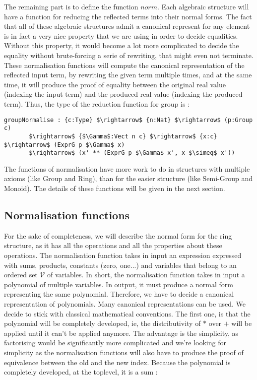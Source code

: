 The remaining part is to define the function $norm$. Each algebraic structure will have a function for reducing the reflected terms into their normal forms. The fact that all of these algebraic structures admit a canonical represent for any element is in fact a very nice property that we are using in order to decide equalities. Without this property, it would become a lot more complicated to decide the equality without brute-forcing a serie of rewriting, that might even not terminate.
These normalisation functions will compute the canonical representation of the reflected input term, by rewriting the given term multiple times, and at the same time, it will produce the proof of equality between the original real value (indexing the input term) and the produced real value (indexing the produced term). Thus, the type of the reduction function for group is :


\begin{lstlisting}
groupNormalise : {c:Type} $\rightarrow$ {n:Nat} $\rightarrow$ (p:Group c) 	   	   	   
	   $\rightarrow$ {$\Gamma$:Vect n c} $\rightarrow$ {x:c} $\rightarrow$ (ExprG p $\Gamma$ x) 
	   $\rightarrow$ (x' ** (ExprG p $\Gamma$ x', x $\simeq$ x'))
\end{lstlisting}


The functions of normalisation have more work to do in structures with multiple axioms (like Group and Ring), than for the easier structure (like Semi-Group and Monoid).
The details of these functions will be given in the next section.


\subsection{Normalisation functions}
\label{sect:normalFormShape}

For the sake of completeness, we will describe the normal form for the ring structure, as it has all the operations and all the properties about these operations.
The normalisation function takes in input an expression expressed with sums, products, constants (zero, one...) and variables that belong to an ordered set $\mathcal{V}$ of variables. In short, the normalisation function takes in input a polynomial of multiple variables. In output, it must produce a normal form representing the same polynomial. Therefore, we have to decide a canonical representation of polynomials. Many canonical representations can be used. We decide to stick with classical mathematical conventions. The first one, is that the polynomial will be completely developed, ie, the distributivity of $*$ over $+$ will be applied until it can't be applied anymore. The advantage is the simplicity, as factorising would be significantly more complicated and we're looking for simplicity as the normalisation functions will also have to produce the proof of equivalence between the old and the new index. Because the polynomial is completely developed, at the toplevel, it is a sum :


